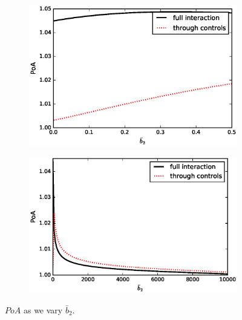 \documentclass[11pt]{article}
\begin{document}
\begin{figure}[!htb]
	\centering
	\begin{subfigure}{.45\textwidth}
		\includegraphics[scale=0.5]{PoA_final_b2bar_0.eps}
	\end{subfigure}
	\begin{subfigure}{.45\textwidth}
		\includegraphics[scale=0.5]{PoA_half_even_more_steps_b2bar_2.eps}
	\end{subfigure}
	\caption{$PoA$ as we vary $\bar{b}_2$.}
	\label{fig:b2bar}
\end{figure}
\end{document}
